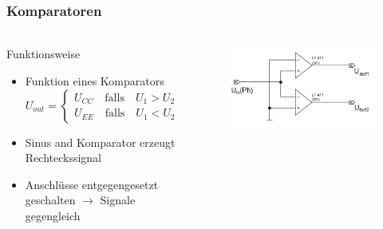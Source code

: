 \begin{frame}
\frametitle{Komparatoren}
\framesubtitle{}
    \begin{columns}[c]
            \begin{block}{Funktionsweise}
                 \begin{itemize}
                     \item Funktion eines Komparators
                        \begin{equation*}
                        U_{out}=
                            \begin{cases} 
                                U_{CC} \quad \text{falls} \quad U_1 > U_2 \\
                                U_{EE} \quad \text{falls} \quad U_1 < U_2
                            \end{cases}
                        \end{equation*}
                    \item Sinus and Komparator erzeugt Rechteckssignal
                     \item Anschlüsse entgegengesetzt geschalten $\rightarrow$ Signale
                     gegengleich
                 \end{itemize}
            \end{block}
            \begin{figure}[H]
            \begin{center}
                    \includegraphics[scale=0.3]{./img/schaltung/Komparatoren.png}
            \end{center}
            \end{figure}
    \end{columns}
\end{frame}

